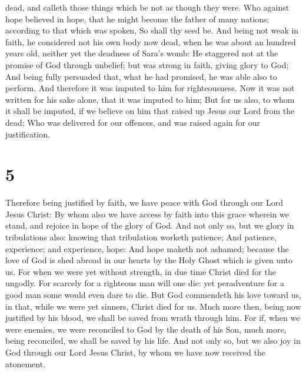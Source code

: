 dead, and calleth those things which be not as though they were.
 Who against hope believed in hope, that he might become
the father of many nations; according to that which was spoken, So shall
thy seed be.  And being not weak in faith, he considered
not his own body now dead, when he was about an hundred years old,
neither yet the deadness of Sara's womb:  He staggered
not at the promise of God through unbelief; but was strong in faith,
giving glory to God;  And being fully persuaded that,
what he had promised, he was able also to perform.  And
therefore it was imputed to him for righteousness.  Now
it was not written for his sake alone, that it was imputed to him;
 But for us also, to whom it shall be imputed, if we
believe on him that raised up Jesus our Lord from the dead;
 Who was delivered for our offences, and was raised again
for our justification.

\hypertarget{section-4}{%
\section{5}\label{section-4}}

 Therefore being justified by faith, we have peace with
God through our Lord Jesus Christ:  By whom also we have
access by faith into this grace wherein we stand, and rejoice in hope of
the glory of God.  And not only so, but we glory in
tribulations also: knowing that tribulation worketh patience;
 And patience, experience; and experience, hope:
 And hope maketh not ashamed; because the love of God is
shed abroad in our hearts by the Holy Ghost which is given unto us.
 For when we were yet without strength, in due time Christ
died for the ungodly.  For scarcely for a righteous man
will one die: yet peradventure for a good man some would even dare to
die.  But God commendeth his love toward us, in that,
while we were yet sinners, Christ died for us.  Much more
then, being now justified by his blood, we shall be saved from wrath
through him.  For if, when we were enemies, we were
reconciled to God by the death of his Son, much more, being reconciled,
we shall be saved by his life.  And not only so, but we
also joy in God through our Lord Jesus Christ, by whom we have now
received the atonement.

